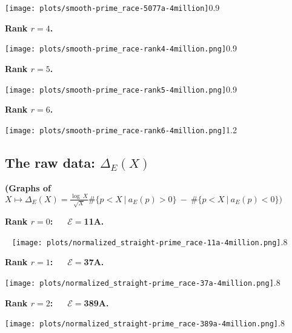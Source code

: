 \documentclass[11pt]{article}
\theoremstyle{plain}
\theoremstyle{definition}
\numberwithin{equation}{section}
\numberwithin{figure}{section}
\numberwithin{table}{section}
\begin{document}
     \texttt{[image: plots/smooth-prime\_race-5077a-4million]}{0.9}~\label{s5077}

  \vskip30pt


  \centerline{\bf Rank $r=4$.}


  \vskip10pt



     \texttt{[image: plots/smooth-prime\_race-rank4-4million.png]}{0.9}~\label{sr4}

 \newpage


  \centerline{\bf Rank $r=5$.}


     \texttt{[image: plots/smooth-prime\_race-rank5-4million.png]}{0.9}~\label{sr5}


  \vskip30pt


  \centerline{\bf Rank $r=6$.}


 \vskip20pt



     \texttt{[image: plots/smooth-prime\_race-rank6-4million.png]}{1.2}~\label{sr6}
      \newpage
\subsection{The raw data: $\Delta_E(X)$}
\vskip40pt

  \centerline{\bf (Graphs of \ \   $X\mapsto \Delta_E(X)=  {\frac{\log\ X}{\sqrt X}}\#\{ p < X\ | \ a_E(p) > 0\}\ - \ \#\{ p < X\ | \  a_E(p) < 0\})$}  \vskip40pt


 \centerline{\bf Rank $r=0$:\ \ \  ${\mathcal E}=$11A.}~ \texttt{[image: plots/normalized\_straight-prime\_race-11a-4million.png]}{.8}~\label{nr11}


\vskip40pt



  \centerline{\bf Rank $r=1$:\ \ \  ${\mathcal E}=$37A.}


 \vskip60pt



     \texttt{[image: plots/normalized\_straight-prime\_race-37a-4million.png]}{.8}~\label{nr37}
%

  \vskip40pt



  \centerline{\bf Rank $r=2$:\ \ \  ${\mathcal E}=$389A.}


  \vskip20pt



     \texttt{[image: plots/normalized\_straight-prime\_race-389a-4million.png]}{.8}~\label{nr389}
\end{document}
